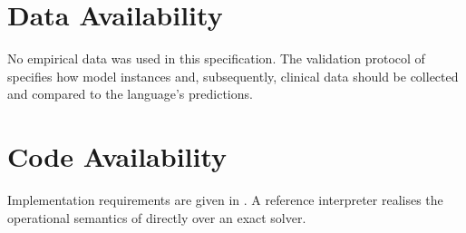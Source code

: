 \section*{Data Availability}
No empirical data was used in this specification. The validation protocol of
 specifies how model instances and, subsequently, clinical
data should be collected and compared to the language's predictions.

\section*{Code Availability}
Implementation requirements are given in . A reference
interpreter realises the operational semantics of  directly over
an exact solver.
